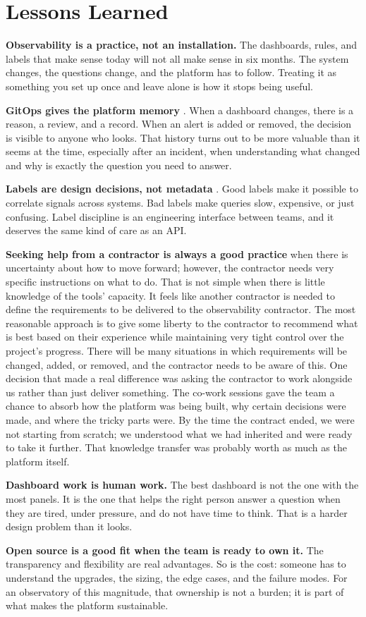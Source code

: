 \section{Lessons Learned}

\textbf{Observability is a practice, not an installation.} The dashboards, rules, and labels that
make sense today will not all make sense in six months. The system changes, the questions change,
and the platform has to follow. Treating it as something you set up once and leave alone is how it
stops being useful.

\textbf{GitOps gives the platform memory} \cite{lsst-it-k8s-cookbook}. When a dashboard changes,
there is a reason, a review, and a record. When an alert is added or removed, the decision is
visible to anyone who looks. That history turns out to be more valuable than it seems at the time,
especially after an incident, when understanding what changed and why is exactly the question you
need to answer.

\textbf{Labels are design decisions, not metadata}
\cite{prometheus-operator,grafana-loki}. Good labels make it possible to correlate signals across
systems. Bad labels make queries slow, expensive, or just confusing. Label discipline is an
engineering interface between teams, and it deserves the same kind of care as an API.

\textbf{Seeking help from a contractor is always a good practice} when there is uncertainty about
how to move forward; however, the contractor needs very specific instructions on what to do. That
is not simple when there is little knowledge of the tools' capacity. It feels like another
contractor is needed to define the requirements to be delivered to the observability contractor.
The most reasonable approach is to give some liberty to the contractor to recommend what is best
based on their experience while maintaining very tight control over the project's progress. There
will be many situations in which requirements will be changed, added, or removed, and the
contractor needs to be aware of this. One decision that made a real difference was asking the
contractor to work alongside us rather than just deliver something. The co-work sessions gave the
team a chance to absorb how the platform was being built, why certain decisions were made, and
where the tricky parts were. By the time the contract ended, we were not starting from scratch; we
understood what we had inherited and were ready to take it further. That knowledge transfer was
probably worth as much as the platform itself.

\textbf{Dashboard work is human work.} The best dashboard is not the one with the most panels. It
is the one that helps the right person answer a question when they are tired, under pressure, and
do not have time to think. That is a harder design problem than it looks.

\textbf{Open source is a good fit when the team is ready to own it.} The transparency and
flexibility are real advantages. So is the cost: someone has to understand the upgrades, the
sizing, the edge cases, and the failure modes. For an observatory of this magnitude, that ownership is not a burden; it is part of what makes the platform
sustainable.